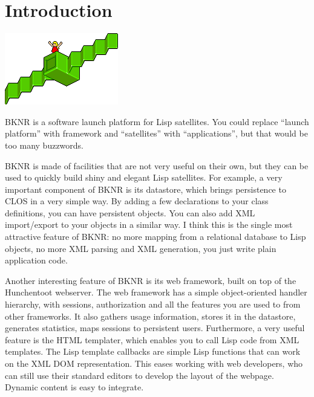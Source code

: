 \chapter{Introduction}
\label{sec:introduction}

\vbox{
\centering
\includegraphics{satelliteicon}
\vspace{1cm}
}

BKNR is a software launch platform for Lisp satellites. You could
replace ``launch platform'' with framework and ``satellites'' with
``applications'', but that would be too many buzzwords.

BKNR is made of facilities that are not very useful on their own, but
they can be used to quickly build shiny and elegant Lisp
satellites. For example, a very important component of BKNR is its
datastore, which brings persistence to CLOS in a very simple way. By
adding a few declarations to your class definitions, you can have
persistent objects. You can also add XML import/export to your objects
in a similar way. I think this is the single most attractive feature
of BKNR: no more mapping from a relational database to Lisp objects,
no more XML parsing and XML generation, you just write plain
application code.


Another interesting feature of BKNR is its web framework, built on top
of the Hunchentoot webserver. The web framework has a simple
object-oriented handler hierarchy, with sessions, authorization and
all the features you are used to from other frameworks. It also
gathers usage information, stores it in the datastore, generates
statistics, maps sessions to persistent users. Furthermore, a very
useful feature is the HTML templater, which enables you to call Lisp
code from XML templates. The Lisp template callbacks are simple Lisp
functions that can work on the XML DOM representation. This eases
working with web developers, who can still use their standard editors
to develop the layout of the webpage. Dynamic content is easy to
integrate.

